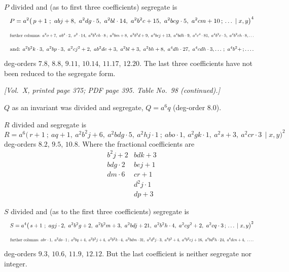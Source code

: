 \documentclass[11pt]{article}
\begin{document}
\medskip

\noindent$P$ divided and (as to first three coefficients) segregate is
\[
\resizebox{\textwidth}{!}{$\displaystyle
P=a^{2}\bigl(\,p+1\ ;\ abj+8,\ a^{2}dg\cdot 5,\ a^{2}bl\cdot 14,\ a^{2}b^{2}c+15,\ a^{2}bcg\cdot 5,\ a^{2}cm+10\,;\,\ldots\,\mid x,y\bigr)^{4}
$}
\]
\[
\resizebox{\textwidth}{!}{$\displaystyle
\text{further columns: }a^{2}o+7,\ ab^{4}\cdot 2,\ o^{2}\cdot 14,\ a^{2}b^{2}ch\cdot 8\,;\ a^{2}bm+8,\ a^{2}b^{2}d+9,\ a^{4}bcj+13,\ a^{4}bdh\cdot 9,\ a^{4}c^{4}\cdot 81,\ a^{4}b^{2}c\cdot 5,\ a^{4}b^{2}ch\cdot 8,\ldots
$}
\]
\[
\resizebox{\textwidth}{!}{$\displaystyle
\text{and: }a^{2}b^{2}k\cdot 3,\ a^{2}bp\cdot 3,\ a^{2}cj^{2}+2,\ ab^{2}de+3,\ a^{2}bl+3,\ a^{2}bh+8,\ a^{4}dh\cdot 27,\ a^{4}cdh\cdot 3,\ldots\,;\ a^{4}b^{2}+\,;\ldots.
$}
\]
deg-orders $7.8$, $8.8$, $9.11$, $10.14$, $11.17$, $12.20$. The last three coefficients have not been reduced to the segregate form.

\newpage

\noindent\textit{[Vol.~X, printed page 375; PDF page 395. Table No.~98 (continued).]}

\medskip

\noindent$Q$ as an invariant was divided and segregate, $Q=a^{6}q$ (deg-order $8.0$).

\medskip

\noindent$R$ divided and segregate is
\[
R=a^{6}\bigl(\,r+1\ ;\ aq+1,\ a^{2}b^{2}j+6,\ a^{2}bdg\cdot 5,\ a^{2}hj\cdot 1\ ;\ abo\cdot 1,\ a^{2}gk\cdot 1,\ a^{2}s+3,\ a^{2}cr\cdot 3\,\mid x,y\bigr)^{2}
\]
deg-orders $8.2$, $9.5$, $10.8$. Where the fractional coefficients are
\[
\begin{array}{l|l}
b^{2}j+2 & bdk+3 \\
bdg\cdot 2 & bej+1 \\
dm\cdot 6 & cr+1 \\
 & d^{2}j\cdot 1 \\
 & dp+3
\end{array}
\]

\medskip

\noindent$S$ divided and (as to the first three coefficients) segregate is
\[
\resizebox{\textwidth}{!}{$\displaystyle
S=a^{4}\bigl(\,s+1\ ;\ agj\cdot 2,\ a^{2}b^{2}g+2,\ a^{2}b^{2}m+3,\ a^{2}bdj+21,\ a^{2}b^{2}h\cdot 4,\ a^{2}cg^{2}+2,\ a^{2}cq\cdot 3\,;\,\ldots\,\mid x,y\bigr)^{2}
$}
\]
\[
\resizebox{\textwidth}{!}{$\displaystyle
\text{further columns: }abr\cdot 1,\ a^{2}do\cdot 1\,;\ a^{2}bq+4,\ a^{2}b^{2}j+4,\ a^{2}b^{2}k\cdot 4,\ a^{2}bdm\cdot 31,\ a^{2}d^{2}j\cdot 3,\ a^{4}b^{2}+4,\ a^{4}b^{2}cj+16,\ a^{4}bd^{2}h\cdot 24,\ a^{4}dcn+4,\ \ldots.
$}
\]
deg-orders $9.3$, $10.6$, $11.9$, $12.12$. But the last coefficient is neither segregate nor integer.
\end{document}
